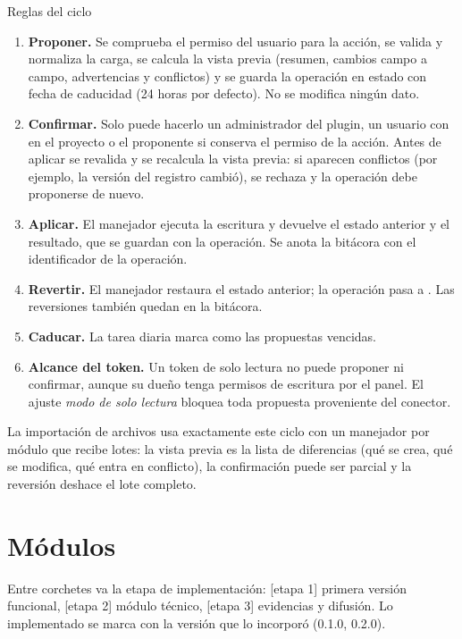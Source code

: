 \documentclass[11pt,a4paper]{article}
\newcommand{\etapa}[1]{\textcolor{grismedio}{[etapa #1]}}
\begin{document}
\begin{caja}{Reglas del ciclo}
\begin{enumerate}
\item \textbf{Proponer.} Se comprueba el permiso del usuario para la acción, se valida y normaliza la carga, se calcula la vista previa (resumen, cambios campo a campo, advertencias y conflictos) y se guarda la operación en estado  con fecha de caducidad (24 horas por defecto). No se modifica ningún dato.
\item \textbf{Confirmar.} Solo puede hacerlo un administrador del plugin, un usuario con  en el proyecto o el proponente si conserva el permiso de la acción. Antes de aplicar se revalida y se recalcula la vista previa: si aparecen conflictos (por ejemplo, la versión del registro cambió), se rechaza y la operación debe proponerse de nuevo.
\item \textbf{Aplicar.} El manejador ejecuta la escritura y devuelve el estado anterior y el resultado, que se guardan con la operación. Se anota la bitácora con el identificador de la operación.
\item \textbf{Revertir.} El manejador restaura el estado anterior; la operación pasa a . Las reversiones también quedan en la bitácora.
\item \textbf{Caducar.} La tarea diaria marca como  las propuestas vencidas.
\item \textbf{Alcance del token.} Un token de solo lectura no puede proponer ni confirmar, aunque su dueño tenga permisos de escritura por el panel. El ajuste \emph{modo de solo lectura} bloquea toda propuesta proveniente del conector.
\end{enumerate}
\end{caja}

La importación de archivos usa exactamente este ciclo con un manejador por módulo que recibe lotes: la vista previa es la lista de diferencias (qué se crea, qué se modifica, qué entra en conflicto), la confirmación puede ser parcial y la reversión deshace el lote completo.

\section{Módulos}
\label{sec:modulos}

Entre corchetes va la etapa de implementación: \etapa{1} primera versión funcional, \etapa{2} módulo técnico, \etapa{3} evidencias y difusión. Lo implementado se marca con la versión que lo incorporó (0.1.0, 0.2.0).
\end{document}

